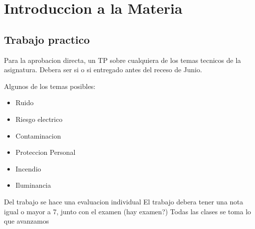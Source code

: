 \chapter*{Introduccion a la Materia}
\section*{Trabajo practico}
Para la aprobacion directa, un TP sobre cualquiera de los temas tecnicos
de la asignatura. Debera ser si o si entregado antes del receso de Junio.

Algunos de los temas posibles:
\begin{itemize}
	\item Ruido
	\item Riesgo electrico
	\item Contaminacion
	\item Proteccion Personal
	\item Incendio
	\item Iluminancia
\end{itemize}

Del trabajo se hace una evaluacion individual
El trabajo debera tener una nota igual o mayor a 7, junto con el examen (hay examen?)
Todas las clases se toma lo que avanzamos
